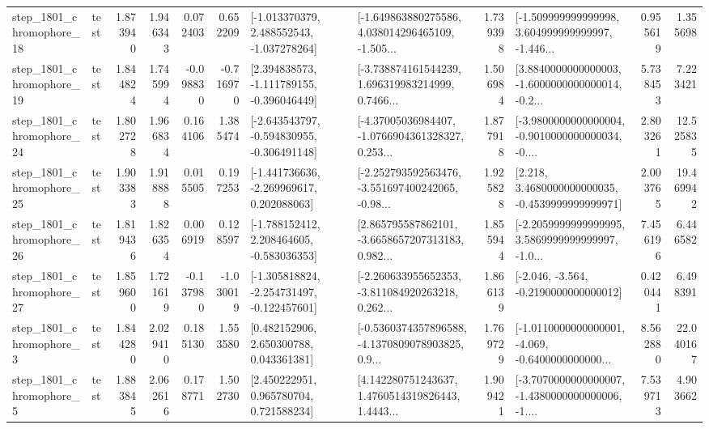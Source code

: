 \begin{tabular}{llrrrrllrlrr}
 step\_1801\_chromophore\_18 &      test &      1.873940 &    1.946343 &      0.072403 &  0.652209 &   [-1.013370379, 2.488552543, -1.037278264] &  [-1.649863880275586, 4.038014296465109, -1.505... &       1.739398 &  [-1.509999999999998, 3.604999999999997, -1.446... &            0.955619 &          1.355698 \\
 step\_1801\_chromophore\_19 &      test &      1.844824 &    1.745994 &     -0.098830 & -0.716970 &   [2.394838573, -1.111789155, -0.396046449] &  [-3.738874161544239, 1.696319983214999, 0.7466... &       1.506984 &  [3.8840000000000003, -1.6000000000000014, -0.2... &            5.738453 &          7.223421 \\
 step\_1801\_chromophore\_24 &      test &      1.802728 &    1.966834 &      0.164106 &  1.385474 &  [-2.643543797, -0.594830955, -0.306491148] &  [-4.37005036984407, -1.0766904361328327, 0.253... &       1.877918 &  [-3.9800000000000004, -0.9010000000000034, -0.... &            2.803261 &         12.525835 \\
 step\_1801\_chromophore\_25 &      test &      1.903383 &    1.918888 &      0.015505 &  0.197253 &   [-1.441736636, -2.269969617, 0.202088063] &  [-2.252793592563476, -3.551697400242065, -0.98... &       1.925828 &   [2.218, 3.4680000000000035, -0.4539999999999971] &            2.003765 &         19.469942 \\
 step\_1801\_chromophore\_26 &      test &      1.819436 &    1.826354 &      0.006919 &  0.128597 &   [-1.788152412, 2.208464605, -0.583036353] &  [2.865795587862101, -3.6658657207313183, 0.982... &       1.855944 &  [-2.2059999999999995, 3.5869999999999997, -1.0... &            7.456196 &          6.446582 \\
 step\_1801\_chromophore\_27 &      test &      1.859600 &    1.721619 &     -0.137980 & -1.030019 &  [-1.305818824, -2.254731497, -0.122457601] &  [-2.260633955652353, -3.811084920263218, 0.262... &       1.866139 &              [-2.046, -3.564, -0.2190000000000012] &            0.420441 &          6.498391 \\
  step\_1801\_chromophore\_3 &      test &      1.844280 &    2.029410 &      0.185130 &  1.553580 &     [0.482152906, 2.650300788, 0.043361381] &  [-0.5360374357896588, -4.1370809078903825, 0.9... &       1.769729 &  [-1.0110000000000001, -4.069, -0.6400000000000... &            8.562880 &         22.040167 \\
  step\_1801\_chromophore\_5 &      test &      1.883845 &    2.062616 &      0.178771 &  1.502730 &     [2.450222951, 0.965780704, 0.721588234] &  [4.142280751243637, 1.4760514319826443, 1.4443... &       1.909421 &  [-3.7070000000000007, -1.4380000000000006, -1.... &            7.539713 &          4.903662 \\

\end{tabular}
